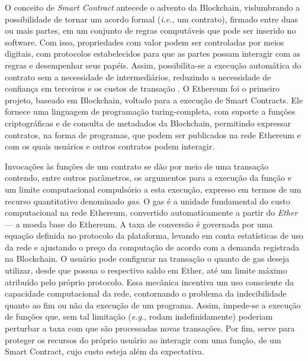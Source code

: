 \documentclass[a4paper,11pt]{article}
\begin{document}

O conceito de \emph{Smart Contract} antecede o advento da Blockchain, vislumbrando a possibilidade de tornar um acordo formal (\emph{i.e.}, um contrato), firmado entre duas ou mais partes, em um conjunto de regras computáveis que pode ser inserido no software. Com isso, propriedades com valor podem ser controladas por meios digitais, com protocolos estabelecidos para que as partes possam interagir com as regras e desempenhar seus papéis.
Assim, possibilita-se a execução automática do contrato sem a necessidade de intermediários, reduzindo a necessidade de confiança em terceiros e os custos de transação \cite{Bartoletti2019, Szabo1996}.
O Ethereum foi o primeiro projeto, baseado em Blockchain, voltado para a execução de Smart Contracts. Ele fornece uma linguagem de programação turing-completa, com suporte a funções criptográficas e de consulta de metadados da Blockchain, permitindo expressar contratos, na forma de programas, que podem ser publicados na rede Ethereum e com os quais usuários e outros contratos podem interagir.

Invocações às funções de um contrato se dão por meio de uma transação contendo, entre outros parâmetros, os argumentos para a execução da função e um limite computacional compulsório a esta execução, expresso em termos de um recurso quantitativo denominado \emph{gas}.
O gas é a unidade fundamental do custo computacional na rede Ethereum,  convertido automaticamente a partir do \emph{Ether} --- a moeda base do Ethereum. A taxa de conversão é governada por uma equação definida no protocolo da plataforma, levando em conta estatísticas de uso da rede e ajustando o preço da computação de acordo com a demanda registrada na Blockchain.
O usuário pode configurar na transação o quanto de gas deseja utilizar, desde que possua o respectivo saldo em Ether, até um limite máximo atribuído pelo próprio protocolo.
Essa mecânica incentiva um uso consciente da capacidade computacional da rede, contornando o problema da indecibilidade quanto ao fim ou não da execução de um programa. Assim, impede-se a execução de funções que, sem tal limitação (\emph{e.g.},  rodam indefinidamente) poderiam perturbar a taxa com que são processadas novas transações. Por fim, serve para proteger os recursos do próprio usuário ao interagir com uma função, de um Smart Contract, cujo custo esteja além da expectativa. %
\end{document}
